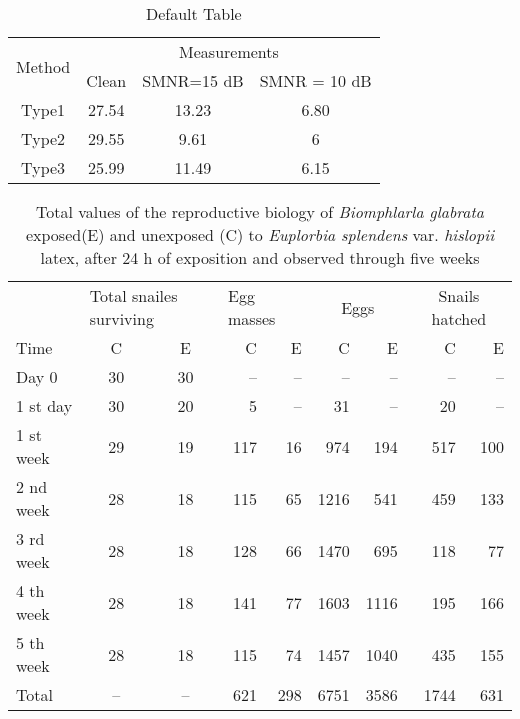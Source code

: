 \documentclass[a4paper,11pt]{article}
\begin{document}
 
\begin{table}[htbp]
\caption{Default Table}
\label{Tab:SRNRValues}
\begin{center}
\begin{tabular}{|c|c|c|c|}
\hline
\multirow{2}{1.5cm}{Method}& \multicolumn{3}{p{5cm}|}{\centering Measurements} \\
\cline{2-4} & \multicolumn{1}{c|}{Clean} & \multicolumn{1}{c|}{SMNR=15 dB} & \multicolumn{1}{c|}{SMNR = 10 dB} \\ \hline
Type1 & 27.54 & 13.23 & 6.80 \\
Type2 & 29.55 & 9.61 & 6 \\
Type3 & 25.99 & 11.49 & 6.15 \\
\hline
\end{tabular}
\end{center}
\end{table}


\begin{table}[htbp]
\caption{Total values of the reproductive biology of \textit{Biomphlarla glabrata} exposed(E) and unexposed (C) to \textit{Euplorbia splendens} var. \textit{hislopii} latex, after 24 h of exposition and observed through five weeks}
\label{Tab:biologyTable}
\begin{center}
\begin{tabular}{l c c r r r r r r}
\hline
  & \multicolumn{2}{l}{Total snailes surviving} & \multicolumn{2}{l}{\centering Egg masses} & \multicolumn{2}{c}{Eggs} & \multicolumn{2}{c}{\centering Snails hatched}\\
\cline{2-9}
Time & C & E & C & E & C & E & C & E \\
\hline
Day 0 & 30 & 30 & -- & -- & -- & -- & -- & -- \\
1 st day & 30 & 20 & 5 & -- & 31 & -- & 20 & -- \\
1 st week & 29 & 19 & 117 & 16 & 974 & 194 & 517 & 100 \\
2 nd week & 28 & 18 & 115 & 65 & 1216 & 541 & 459 & 133 \\
3 rd week & 28 & 18 & 128 & 66 & 1470 & 695 & 118 & 77 \\
4 th week & 28 & 18 & 141 & 77 & 1603 & 1116 & 195 & 166 \\
5 th week & 28 & 18 & 115 & 74 & 1457 & 1040 & 435 & 155 \\
\hline
Total & -- & -- & 621 & 298 & 6751 & 3586 & 1744 & 631 \\
\hline
\end{tabular}
\end{center}
\end{table}
 
\end{document}
